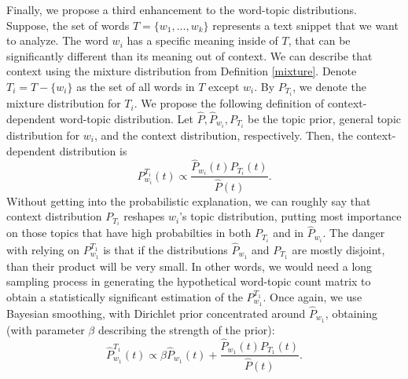 \documentclass{article} %
\begin{document}
Finally, we propose a third enhancement to the word-topic
distributions. Suppose, the set of words $T=\{w_1,...,w_k\}$
represents a text snippet that we want to analyze. The word $w_i$ has
a specific meaning inside of $T$, that can be significantly different
than its meaning out of context. We can describe that context using
the mixture distribution from Definition \ref{mixture}. Denote
$T_i=T-\{w_i\}$ as the set of all words in $T$ except
$w_i$. By $P_{T_i}$, we denote the mixture distribution for $T_i$. We
propose the following definition of context-dependent word-topic
distribution. 
\bed
Let $\widehat{P},\widehat{P}_{w_i},P_{T_i}$ be the topic prior, general
topic distribution for $w_i$, and the context distribution,
respectively. Then, the context-dependent distribution is
\[P^{T_i}_{w_i}(t)\propto \frac{\widehat{P}_{w_i}\!(t)P_{T_i}\!(t)}{\widehat{P}(t)}.\]
\eed
Without getting into the probabilistic explanation, we can roughly say
that context distribution $P_{T_i}$ reshapes $w_i$'s topic
distribution, putting most importance on those topics that have high
probabilties in both $P_{T_i}$ and in $\widehat{P}_{w_i}$.
The danger with relying on $P^{T_1}_{w_1}$
is that if the distributions $\widehat{P}_{w_1}$ and $P_{T_1}$ are
mostly disjoint, than their product will be very small. In other
words, we would need a long sampling process in generating the
hypothetical word-topic count matrix to obtain a statistically
significant estimation of the $P^{T_1}_{w_1}$. Once again,
we use Bayesian smoothing, with Dirichlet prior concentrated around
$\widehat{P}_{w_1}$, obtaining (with
parameter $\beta$ describing the strength of the prior):
\[\widehat{P}^{T_1}_{w_1}(t)\propto \beta \widehat{P}_{w_1}\!(t) + \frac{\widehat{P}_{w_1}\!(t)P_{T_1}\!(t)}{\widehat{P}(t)}.\]
\end{document}
